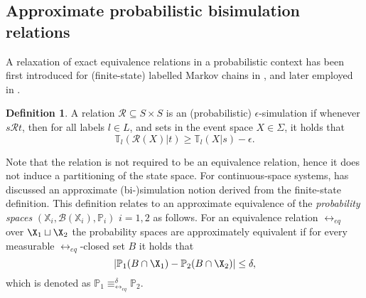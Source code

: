 \documentclass[letterpaper, 10 pt, conference]{amsart}
\theoremstyle{definition}
\newtheorem{defn}[definition]{Definition}
\theoremstyle{example}
\theoremstyle{remark}
\begin{document}
\subsection{Approximate probabilistic bisimulation relations}
A relaxation of exact equivalence relations in a probabilistic context has been first introduced for (finite-state) labelled Markov chains in \cite{desharnais2004metrics}, 
and later employed in \cite{cDAK12}.  
\begin{defn}\label{def:APBDesh} 
A relation $\mathcal R\subseteq S\times S$ is an (probabilistic) $\epsilon$-simulation if whenever $s\mathcal R t$, then for all labels $l\in L$, 
and sets in the event space $X\in\Sigma$, it holds that
\[\mathbb{T}_l(\mathcal{R}(X)|t)\geq \mathbb T_l (X|s)-\epsilon.\]
\end{defn}
Note that the  relation is not required to be an equivalence relation, hence it does not induce a partitioning of the state space.  
For continuous-space systems, \cite{Abate2011} has discussed an approximate (bi-)simulation notion derived from the finite-state definition. 
This definition relates to an approximate equivalence of the \emph{probability spaces} $(\mathbb X_i,\mathcal B(\mathbb X_i ),\mathbb P_i)$ $i=1,2$ as follows. 
For an equivalence relation $\rel_{eq}$ over $\X_1\sqcup\X_2$  the probability spaces are approximately equivalent if for every measurable $\rel_{eq}$-closed set $B$ it holds that
\[|\mathbb P_1(B\cap \X_1)-\mathbb P_2 (B\cap \X_2)|\leq \delta,\] 
which is denoted as $\mathbb P_1\equiv_{\rel_{eq}}^\delta\mathbb P_2$.
\end{document}
